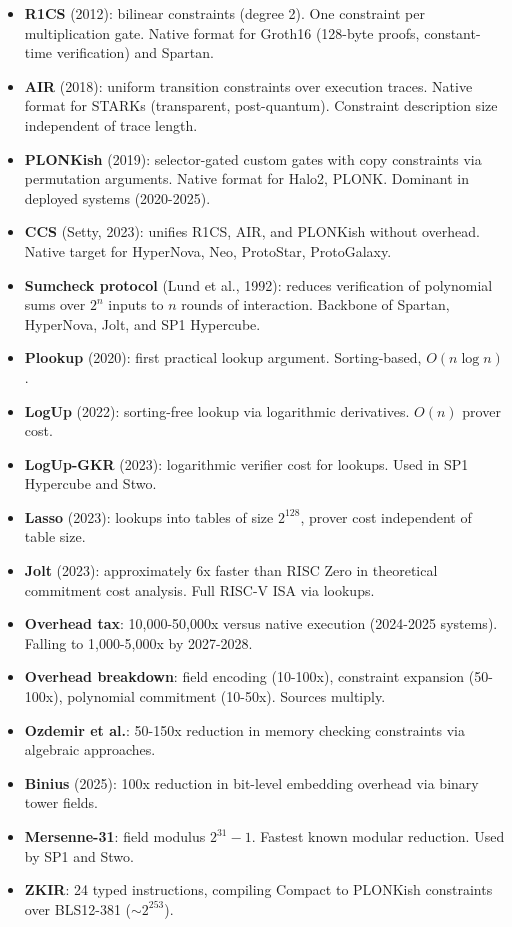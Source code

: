 \documentclass[
  11pt,
  openany]{report}
\providecommand{\tightlist}{%
  \setlength{\itemsep}{0pt}\setlength{\parskip}{0pt}}
\renewcommand{\textbf}[1]{{\bfseries\color{MidnightBold}#1}}
\begin{document}
\begin{itemize}
\tightlist
\item
  \textbf{R1CS} (2012): bilinear constraints (degree 2). One constraint per
  multiplication gate. Native format for Groth16 (128-byte proofs, constant-time
  verification) and Spartan.
\item
  \textbf{AIR} (2018): uniform transition constraints over execution traces.
  Native format for STARKs (transparent, post-quantum). Constraint description
  size independent of trace length.
\item
  \textbf{PLONKish} (2019): selector-gated custom gates with copy constraints
  via permutation arguments. Native format for Halo2, PLONK. Dominant in
  deployed systems (2020-2025).
\item
  \textbf{CCS} (Setty, 2023): unifies R1CS, AIR, and PLONKish without overhead.
  Native target for HyperNova, Neo, ProtoStar, ProtoGalaxy.
\item
  \textbf{Sumcheck protocol} (Lund et al., 1992): reduces verification of
  polynomial sums over \(2^n\) inputs to \(n\) rounds of interaction. Backbone
  of Spartan, HyperNova, Jolt, and SP1 Hypercube.
\item
  \textbf{Plookup} (2020): first practical lookup argument. Sorting-based,
  \(O(n \log n)\).
\item
  \textbf{LogUp} (2022): sorting-free lookup via logarithmic derivatives.
  \(O(n)\) prover cost.
\item
  \textbf{LogUp-GKR} (2023): logarithmic verifier cost for lookups. Used in SP1
  Hypercube and Stwo.
\item
  \textbf{Lasso} (2023): lookups into tables of size \(2^{128}\), prover cost
  independent of table size.
\item
  \textbf{Jolt} (2023): approximately 6x faster than RISC Zero in theoretical
  commitment cost analysis. Full RISC-V ISA via lookups.
\item
  \textbf{Overhead tax}: 10,000-50,000x versus native execution (2024-2025
  systems). Falling to 1,000-5,000x by 2027-2028.
\item
  \textbf{Overhead breakdown}: field encoding (10-100x), constraint expansion
  (50-100x), polynomial commitment (10-50x). Sources multiply.
\item
  \textbf{Ozdemir et al.}: 50-150x reduction in memory checking constraints via
  algebraic approaches.
\item
  \textbf{Binius} (2025): 100x reduction in bit-level embedding overhead via
  binary tower fields.
\item
  \textbf{Mersenne-31}: field modulus \(2^{31} - 1\). Fastest known modular
  reduction. Used by SP1 and Stwo.
\item
  \textbf{ZKIR}: 24 typed instructions, compiling Compact to PLONKish
  constraints over BLS12-381 (\(\sim 2^{253}\)).
\end{itemize}
\end{document}
